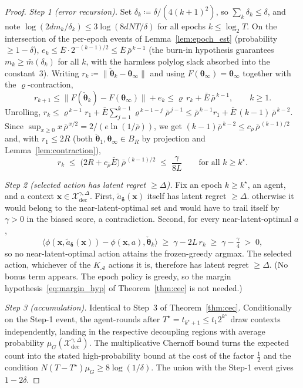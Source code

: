 \documentclass[11pt]{article}
\begin{document}
\begin{proof}
\emph{Step 1 (error recursion).}  Set $\delta_k\coloneqq
\delta/(4(k+1)^2)$, so $\sum_k\delta_k\leq\delta$, and note
$\log(2dm_k/\delta_k)\leq 3\log(8dNT/\delta)$ for all epochs
$k\leq\log_2 T$.  On the intersection of the per-epoch events of
Lemma~\ref{lem:epoch_est} (probability $\geq 1-\delta$),
$e_k\leq\bar E\cdot 2^{-(k-1)/2}\leq\bar E\,\bar\rho^{\,k-1}$
(the burn-in hypothesis guarantees $m_k\geq\bar m(\delta_k)$ for all
$k$, with the harmless polylog slack absorbed into the constant~$3$).
Writing $r_k\coloneqq\|\check{\bm\theta}_k-\bm\theta_\infty\|$ and
using $F(\bm\theta_\infty)=\bm\theta_\infty$ together with the
$\varrho$-contraction,
\[
r_{k+1}\leq\|F(\check{\bm\theta}_k)-F(\bm\theta_\infty)\|+e_k
\leq\varrho\,r_k+\bar E\,\bar\rho^{\,k-1},
\qquad k\geq 1 .
\]
Unrolling,
$r_k\leq\varrho^{\,k-1}r_1+\bar E\sum_{j=1}^{k-1}
\varrho^{\,k-1-j}\bar\rho^{\,j-1}
\leq\bar\rho^{\,k-1}r_1+\bar E\,(k-1)\,\bar\rho^{\,k-2}$.
Since $\sup_{x\geq0}x\,\bar\rho^{\,x/2}=2/(e\ln(1/\bar\rho))$, we get
$(k-1)\bar\rho^{\,k-2}\leq c_{\bar\rho}\,\bar\rho^{\,(k-1)/2}$ and,
with $r_1\leq 2R$ (both $\check{\bm\theta}_1,\bm\theta_\infty\in
B_R$ by projection and Lemma~\ref{lem:contraction}),
\[
r_k\;\leq\;\bigl(2R+c_{\bar\rho}\bar E\bigr)\,\bar\rho^{\,(k-1)/2}
\;\leq\;\frac{\gamma}{8L}
\qquad\text{for all }k\geq k^\star .
\]

\emph{Step 2 (selected action has latent regret $\geq\Delta$).}
Fix an epoch $k\geq k^\star$, an agent, and a context
$\bm x\in\mathcal X_{\mathrm{dec}}^{\gamma,\Delta}$.  First,
$\tilde a_{\bm\delta}(\bm x)$ itself has latent regret $\geq\Delta$.
otherwise it would belong to the near-latent-optimal set and would
have to trail itself by $\gamma>0$ in the biased score, a
contradiction.  Second, for every near-latent-optimal $a$,
\[
\langle\phi(\bm x,\tilde a_{\bm\delta}(\bm x))-\phi(\bm x,a),
\check{\bm\theta}_k\rangle
\;\geq\;\gamma-2L\,r_k\;\geq\;\gamma-\tfrac{\gamma}{4}\;>\;0 ,
\]
so no near-latent-optimal action attains the frozen-greedy argmax.
The selected action, whichever of the $K_{\mathcal A}$ actions it is,
therefore has latent regret $\geq\Delta$.  (No bonus term appears. The epoch policy is greedy, so the margin
hypothesis~\eqref{eq:margin_hyp} of Theorem~\ref{thm:cec} is not
needed.)

\emph{Step 3 (accumulation).}  Identical to Step~3 of
Theorem~\ref{thm:cec}. Conditionally on the Step-1 event, the
agent-rounds after $T^\star=t_{k^\star+1}\leq t_1 2^{k^\star}$ draw
contexts independently, landing in the respective decoupling regions
with average probability
$\mu_G(\mathcal X_{\mathrm{dec}}^{\gamma,\Delta})$. The multiplicative
Chernoff bound turns the expected count into the stated
high-probability bound at the cost of the factor $\tfrac12$ and the
condition $N(T-T^\star)\mu_G\geq 8\log(1/\delta)$.  The union with the
Step-1 event gives $1-2\delta$.
\end{proof}
\end{document}
